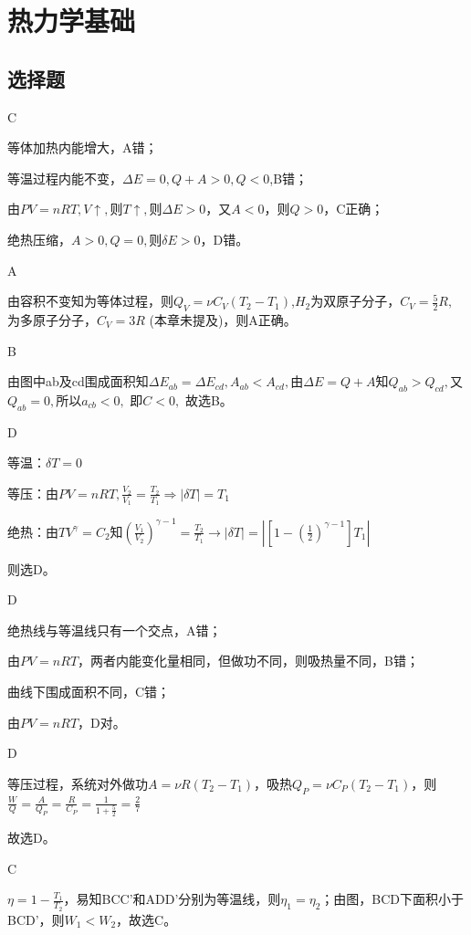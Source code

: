 \documentclass[b5paper,opensource]{./template/qyxf-book}
\begin{document}
\setcounter{chapter}{10}
\chapter{热力学基础}
\section{选择题}
C

\solve 
等体加热内能增大，A错；

等温过程内能不变，$\Delta E = 0,Q+A>0,Q<0$,B错；

由$PV=nRT,V\uparrow ,$则$T\uparrow,$则$\Delta E>0$，又$A<0$，则$Q>0$，C正确；

绝热压缩，$A>0,Q=0,$则$\delta E>0$，D错。

A

\solve 
由容积不变知为等体过程，则${Q_V} = \nu {C_V}({T_2} - {T_1})$,$H_2$为双原子分子，${C_V} = \frac{5}{2}R,$ 为多原子分子，$C_V=3R$ (本章未提及)，则A正确。


B

\solve 由图中ab及cd围成面积知$\Delta {E_{ab}} = \Delta {E_{cd}},A_{ab} < {A_{cd}},$由$\Delta E = Q + A$知$Q_{ab} > {Q_{cd}},$又${Q_{ab}} = 0,$所以${a_{cb}} < 0,$  即$C < 0,$ 故选B。


D

\solve 等温：$\delta T=0$

等压：由$PV=nRT,\frac{V_2}{V_1}=\frac{T_2}{T_1} \Rightarrow |\delta T|=T_1$

绝热：由$TV^\gamma=C_2$知$(\frac{V_1}{V_2})^{\gamma-1}=\frac{T_2}{T_1}\rightarrow |\delta T|=|[1-(\frac{1}{2})^{\gamma-1}]T_1|$

则选D。

D

\solve 绝热线与等温线只有一个交点，A错；

由$PV=nRT$，两者内能变化量相同，但做功不同，则吸热量不同，B错；

曲线下围成面积不同，C错；

由$PV=nRT$，D对。

D

\solve 等压过程，系统对外做功$A=\nu R(T_2-T_1)$，吸热$Q_P=\nu C_P(T_2-T_1)$，则$\frac{W}{Q}=\frac{A}{Q_P}=\frac{R}{C_P}=\frac{1}{1+\frac{5}{2}}=\frac{2}{7}$

故选D。

C

\solve $\eta=1-\frac{T_1}{T_2}$，易知BCC'和ADD'分别为等温线，则$\eta_1=\eta_2$；由图，BCD下面积小于BCD'，则$W_1<W_2$，故选C。
\end{document}
